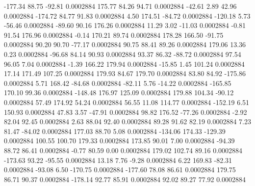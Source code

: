      -177.34       88.75      -92.81     0.0002884
      175.77       84.26       94.71     0.0002884
      -42.61        2.89       42.96     0.0002884
     -174.72       84.77       91.83     0.0002884
        4.50      174.51      -84.72     0.0002884
     -120.18        5.73      -56.46     0.0002884
      -89.60       90.16      176.26     0.0002884
       11.29        3.02      -11.03     0.0002884
       -0.81       91.54      176.96     0.0002884
       -0.14      170.21       89.74     0.0002884
      178.28      166.50      -91.75     0.0002884
       90.20       90.70      -77.17     0.0002884
       90.75       88.41       89.26     0.0002884
      179.06       13.36        0.23     0.0002884
      -96.68       84.14       90.93     0.0002884
       93.37       86.32      -88.72     0.0002884
       97.54       96.05        7.04     0.0002884
       -1.39      166.22      179.94     0.0002884
      -15.85        1.45      101.24     0.0002884
       17.14      171.49      107.25     0.0002884
      179.93       84.67      179.70     0.0002884
       83.80       84.92     -175.86     0.0002884
        5.71      168.42      -84.68     0.0002884
      -82.11        5.76      -14.22     0.0002884
     -165.85      170.10       99.36     0.0002884
     -148.48      176.97      125.09     0.0002884
      179.88      104.34      -90.12     0.0002884
       57.49      174.92       54.24     0.0002884
       56.55       11.08      114.77     0.0002884
     -152.19        6.51      150.93     0.0002884
       47.83        3.57      -47.91     0.0002884
       98.82      176.52      -77.26     0.0002884
       -2.92       82.04       92.45     0.0002884
        2.63       88.04       92.40     0.0002884
       89.28       91.62       82.19     0.0002884
        7.23       81.47      -84.02     0.0002884
      177.03       88.70        5.08     0.0002884
     -134.06      174.33     -129.39     0.0002884
      100.55      100.70      179.33     0.0002884
      173.85       90.01        7.00     0.0002884
      -94.39       88.72       86.41     0.0002884
       -0.77       80.59        0.00     0.0002884
      179.02      102.74       89.16     0.0002884
     -173.63       93.22      -95.55     0.0002884
       13.18        7.76       -9.28     0.0002884
        6.22      169.83      -82.31     0.0002884
      -93.08        6.50     -170.75     0.0002884
     -177.60       78.08       86.61     0.0002884
      179.75       86.71       90.37     0.0002884
     -178.14       92.77       85.91     0.0002884
       92.02       89.27       77.92     0.0002884
